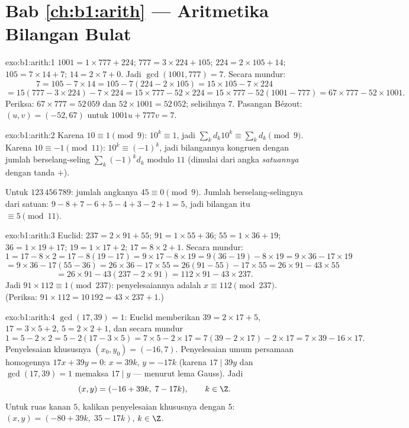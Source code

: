 \section*{Bab \ref{ch:b1:arith} --- Aritmetika Bilangan Bulat}

\begin{solution}{exo:b1:arith:1}
$1001 = 1 \times 777 + 224$; $777 = 3 \times 224 + 105$; $224 = 2
\times 105 + 14$; $105 = 7 \times 14 + 7$; $14 = 2 \times 7 + 0$. Jadi
$\gcd(1001, 777) = 7$. Secara mundur:
\[
7 = 105 - 7 \times 14
= 105 - 7(224 - 2\times 105) = 15 \times 105 - 7 \times 224
\]
\[
= 15(777 - 3\times 224) - 7\times 224 = 15 \times 777 - 52 \times 224
= 15 \times 777 - 52(1001 - 777) = 67 \times 777 - 52 \times 1001 .
\]
Periksa: $67 \times 777 = 52\,059$ dan $52 \times 1001 = 52\,052$;
selisihnya $7$. Pasangan Bézout: $(u, v) = (-52, 67)$ untuk $1001u + 777v =
7$.
\end{solution}

\begin{solution}{exo:b1:arith:2}
Karena $10 \equiv 1 \pmod 9$: $10^k \equiv 1$, jadi $\sum_k d_k 10^k
\equiv \sum_k d_k \pmod 9$. Karena $10 \equiv -1 \pmod{11}$: $10^k
\equiv (-1)^k$, jadi bilangannya kongruen dengan jumlah berselang-seling
$\sum_k (-1)^k d_k$ modulo $11$ (dimulai dari angka \emph{satuannya}
dengan tanda $+$).

Untuk $123\,456\,789$: jumlah angkanya $45 \equiv 0 \pmod 9$. Jumlah berselang-selingnya dari
satuan: $9 - 8 + 7 - 6 + 5 - 4 + 3 - 2 + 1 = 5$, jadi bilangan itu
$\equiv 5 \pmod{11}$.
\end{solution}

\begin{solution}{exo:b1:arith:3}
Euclid: $237 = 2 \times 91 + 55$; $91 = 1 \times 55 + 36$; $55 = 1
\times 36 + 19$; $36 = 1 \times 19 + 17$; $19 = 1 \times 17 + 2$; $17
= 8 \times 2 + 1$. Secara mundur:
\[
1 = 17 - 8\times 2 = 17 - 8(19 - 17) = 9\times 17 - 8\times 19
= 9(36 - 19) - 8\times 19 = 9\times 36 - 17\times 19
\]
\[
= 9\times 36 - 17(55 - 36) = 26\times 36 - 17\times 55
= 26(91 - 55) - 17\times 55 = 26\times 91 - 43\times 55
\]
\[
= 26\times 91 - 43(237 - 2\times 91) = 112 \times 91 - 43 \times 237.
\]
Jadi $91 \times 112 \equiv 1 \pmod{237}$: penyelesaiannya adalah $x \equiv
112 \pmod{237}$. (Periksa: $91 \times 112 = 10\,192 = 43 \times 237 +
1$.)
\end{solution}

\begin{solution}{exo:b1:arith:4}
$\gcd(17, 39) = 1$: Euclid memberikan $39 = 2\times 17 + 5$, $17 = 3\times
5 + 2$, $5 = 2\times 2 + 1$, dan secara mundur
\[
1 = 5 - 2\times 2 = 5 - 2(17 - 3\times 5) = 7\times 5 - 2\times 17
= 7(39 - 2\times 17) - 2\times 17 = 7\times 39 - 16\times 17 .
\]
Penyelesaian khususnya $(x_0, y_0) = (-16, 7)$. Penyelesaian umum
persamaan homogennya $17x + 39y = 0$: $x = 39k$, $y = -17k$ (karena
$17 \mid 39y$ dan $\gcd(17,39) = 1$ memaksa $17 \mid y$ ---
menurut lema Gauss). Jadi
\[
(x, y) = (-16 + 39k,\; 7 - 17k), \qquad k \in \Z .
\]
Untuk ruas kanan $5$, kalikan penyelesaian khususnya dengan $5$:
$(x, y) = (-80 + 39k,\; 35 - 17k)$, $k \in \Z$.
\end{solution}

